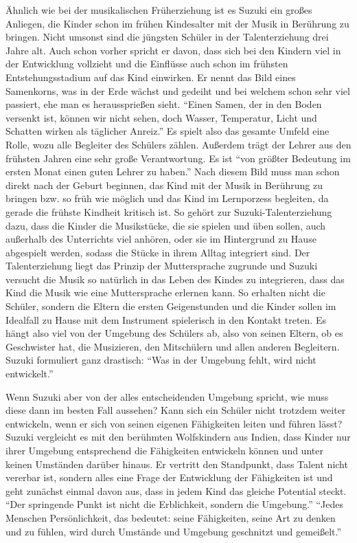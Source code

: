 Ähnlich wie bei der musikalischen Früherziehung ist es Suzuki ein großes
Anliegen, die Kinder schon im frühen Kindesalter mit der Musik in Berührung zu
bringen. Nicht umsonst sind die jüngsten Schüler in der Talenterziehung drei
Jahre alt. Auch schon vorher spricht er davon, dass sich bei den Kindern viel in
der Entwicklung vollzieht und die Einflüsse auch schon im frühsten
Entstehungsstadium auf das Kind einwirken. Er nennt das Bild eines Samenkorns,
was in der Erde wächst und gedeiht und bei welchem schon sehr viel passiert, ehe
man es heraussprießen sieht. \enquote{Einen Samen, der in den Boden versenkt ist, können
wir nicht sehen, doch Wasser, Temperatur, Licht und Schatten wirken als
täglicher Anreiz.}\autocite[17]{suzuki:erziehung_ist_liebe} Es spielt also das
gesamte Umfeld eine Rolle, wozu alle Begleiter des Schülers zählen. Außerdem
trägt der Lehrer aus den frühsten Jahren eine sehr große Verantwortung. Es ist
\enquote{von größter Bedeutung im ersten Monat einen guten Lehrer zu haben.}
\autocite[21]{suzuki:erziehung_ist_liebe} Nach diesem Bild muss man schon direkt
nach der Geburt beginnen, das Kind mit der Musik in Berührung zu bringen bzw. so
früh wie möglich und das Kind im Lernporzess begleiten, da gerade die frühste
Kindheit kritisch ist. \autocite[25]{suzuki:erziehung_ist_liebe} So gehört zur
Suzuki-Talenterziehung dazu, dass die Kinder die Musikstücke, die sie spielen
und üben sollen, auch außerhalb des Unterrichts viel anhören, oder sie im
Hintergrund zu Hause abgespielt werden, sodass die Stücke in ihrem Alltag
integriert sind. Der Talenterziehung liegt das Prinzip der Muttersprache
zugrunde und Suzuki versucht die Musik so natürlich in das Leben des Kindes zu
integrieren, dass das Kind die Musik wie eine Muttersprache erlernen kann.  So
erhalten nicht die Schüler, sondern die Eltern die ersten Geigenstunden und die
Kinder sollen im Idealfall zu Hause mit dem Instrument spielerisch
in den Kontakt treten. \autocite[75]{suzuki:erziehung_ist_liebe} Es hängt also
viel von der Umgebung des Schülers ab, also von seinen Eltern, ob es Geschwister
hat, die Musizieren, den Mitschülern und allen anderen Begleitern. Suzuki
formuliert ganz drastisch: \enquote{Was in der Umgebung fehlt, wird nicht entwickelt.}
\autocite[25]{suzuki:erziehung_ist_liebe}

Wenn Suzuki aber von der alles entscheidenden Umgebung spricht, wie muss diese
dann im besten Fall aussehen? Kann sich ein Schüler nicht trotzdem weiter
entwickeln, wenn er sich von seinen eigenen Fähigkeiten leiten und führen lässt?
Suzuki vergleicht es mit den berühmten Wolfskindern aus Indien, dass Kinder nur
ihrer Umgebung entsprechend die Fähigkeiten entwickeln können und unter keinen
Umständen darüber hinaus. \autocite[24]{suzuki:erziehung_ist_liebe} Er vertritt
den Standpunkt, dass Talent nicht vererbar ist, sondern alles eine Frage der
Entwicklung der Fähigkeiten ist und geht zunächst einmal davon aus, dass in
jedem Kind das gleiche Potential steckt. \enquote{Der springende Punkt ist nicht die
Erblichkeit, sondern die Umgebung.} \autocite[24]{suzuki:erziehung_ist_liebe}
\enquote{Jedes Menschen Persönlichkeit, das bedeutet: seine Fähigkeiten, seine Art zu
denken und zu fühlen, wird durch Umstände und Umgebung geschnitzt und
gemeißelt.} \autocite[20]{suzuki:erziehung_ist_liebe}

